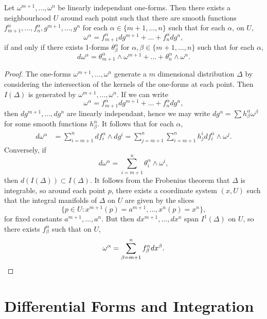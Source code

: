 \begin{corollary}
    Let $\omega^{m+1}, \dots, \omega^n$ be linearly independant one-forms. Then there exists a neighbourhood $U$ around each point such that there are smooth functions $f^\alpha_{m+1}, \dots, f^\alpha_n, g^{m+1}, \dots, g^n$ for each $\alpha \in \{ m+1, \dots, n \}$ such that for each $\alpha$, on $U$,
    \[ \omega^\alpha = f^\alpha_{m+1} dg^{m+1} + \dots + f^\alpha_n dg^n, \]
    if and only if there exists 1-forms $\theta^\alpha_\beta$ for $\alpha, \beta \in \{ m+1, \dots, n \}$ such that for each $\alpha$,
    \[ d\omega^\alpha = \theta^\alpha_{m+1} \wedge \omega^{m+1} + \dots + \theta^\alpha_n \wedge \omega^n. \]
\end{corollary}
\begin{proof}
    The one-forms $\omega^{m+1}, \dots, \omega^n$ generate a $m$ dimensional distribution $\Delta$ by considering the intersection of the kernels of the one-forms at each point. Then $I(\Delta)$ is generated by $\omega^{m+1}, \dots, \omega^n$. If we can write
    \[ \omega^\alpha = f^\alpha_{m+1} dg^{m+1} + \dots + f^\alpha_n dg^n, \]
    then $dg^{m+1}, \dots, dg^n$ are linearly independant, hence we may write $dg^\alpha = \sum h^\alpha_\beta \omega^\beta$ for some smooth functions $h^\alpha_\beta$. It follows that for each $\alpha$,
    \begin{align*}
        d\omega^\alpha &= \sum_{i = m+1}^n df^\alpha_i \wedge dg^i = \sum_{j = m+1}^n \sum_{i = m+1}^n h^i_j df^\alpha_i \wedge \omega^j.
    \end{align*}
    Conversely, if
    \[ d\omega^\alpha = \sum_{i = m+1}^n \theta^\alpha_i \wedge \omega^i, \]
    then $d(I(\Delta)) \subset I(\Delta)$. It follows from the Frobenius theorem that $\Delta$ is integrable, so around each point $p$, there exists a coordinate system $(x,U)$ such that the integral manifolds of $\Delta$ on $U$ are given by the slices
    \[ \{ p \in U: x^{m+1}(p) = a^{m+1}, \dots, x^n(p) = x^n \}, \]
    for fixed constants $a^{m+1}, \dots, a^n$. But then $dx^{m+1}, \dots, dx^n$ span $I^1(\Delta)$ on $U$, so there exists $f^\alpha_\beta$ such that on $U$,
    \[ \omega^\alpha = \sum_{\beta = m+1}^n f^\alpha_\beta dx^\beta. \qedhere \]
\end{proof}

\chapter{Differential Forms and Integration}

